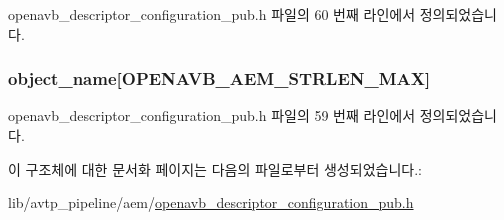 openavb\+\_\+descriptor\+\_\+configuration\+\_\+pub.\+h 파일의 60 번째 라인에서 정의되었습니다.

\subsubsection[{\texorpdfstring{object\+\_\+name}{object_name}}]{ object\+\_\+name\mbox{[}{\bf O\+P\+E\+N\+A\+V\+B\+\_\+\+A\+E\+M\+\_\+\+S\+T\+R\+L\+E\+N\+\_\+\+M\+AX}\mbox{]}}\hypertarget{structopenavb__aem__descriptor__configuration__t_a5e98aba8105a7a6d82fac41816c83da3}{}\label{structopenavb__aem__descriptor__configuration__t_a5e98aba8105a7a6d82fac41816c83da3}


openavb\+\_\+descriptor\+\_\+configuration\+\_\+pub.\+h 파일의 59 번째 라인에서 정의되었습니다.



이 구조체에 대한 문서화 페이지는 다음의 파일로부터 생성되었습니다.\+:\begin{DoxyCompactItemize}
\item 
lib/avtp\+\_\+pipeline/aem/\hyperlink{openavb__descriptor__configuration__pub_8h}{openavb\+\_\+descriptor\+\_\+configuration\+\_\+pub.\+h}\end{DoxyCompactItemize}
